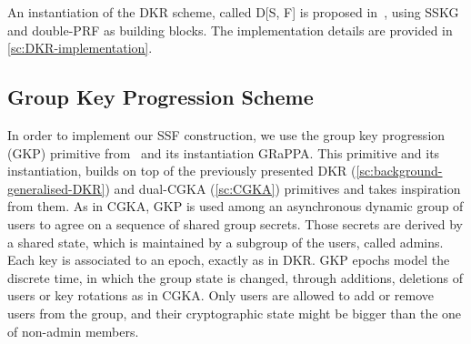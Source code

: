 An instantiation of the DKR scheme, called D[S, F] is proposed in~\cite{GKP},
using SSKG and double-PRF as building blocks. The implementation
details are provided in \cref{sc:DKR-implementation}.


\subsection{Group Key Progression Scheme}\label{sc:gkp-scheme}

In order to implement our SSF construction, we use the group key 
progression (GKP) primitive from~\cite{GKP} and its
instantiation GRaPPA.
This primitive and its instantiation, builds on top of the previously presented DKR
(\cref{sc:background-generalised-DKR}) and dual-CGKA (\cref{sc:CGKA}) primitives
and takes inspiration from them.
As in CGKA, GKP is used among an asynchronous dynamic group of users
to agree on a sequence of shared group secrets. Those secrets
are derived by a shared state, which is maintained by a
subgroup of the users, called admins. Each key is associated to
an epoch, exactly as in DKR. GKP epochs model
the discrete time, in which the group state is changed, through
additions, deletions of users or key rotations as in CGKA.
Only users are allowed to add or remove users from the group,
and their cryptographic state might be bigger than the one of
non-admin members.

